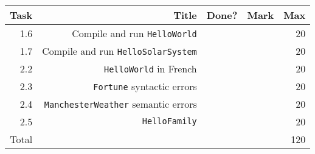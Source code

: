 \newcommand{\class}[1]{\texttt{#1}}
\newcommand{\method}[2]{\texttt{#2()}}
\\ \\ \\ \noindent\parbox[l]{\textwidth}{
 \\ \\
\begin{tabular}{||r|r|r|r|r||} \hline \hline
Task  & Title                            & Done? & Mark & Max \\ \hline
1.6 & Compile and run \class{HelloWorld} & & & 20 \\ \hline
1.7 & Compile and run \class{HelloSolarSystem} & & & 20 \\ \hline
2.2 & \class{HelloWorld} in French & & & 20 \\ \hline
2.3 & \class{Fortune} syntactic errors & & & 20 \\ \hline
2.4 & \class{ManchesterWeather} semantic errors & & & 20 \\ \hline
2.5 & \class{HelloFamily} & & & 20 \\ \hline
\hline
Total &                                  &       &      & 120 \\ \hline
\hline
\end{tabular} \\ \\
}
